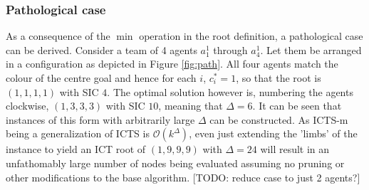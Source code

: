 \documentclass[english,10pt]{article}
\begin{document}
	\subsubsection{Pathological case}
	\label{pathology}
	As a consequence of the $\min$ operation in the root definition, a pathological case can be derived. Consider a team of 4 agents $a_1^1$ through $a_4^1$. Let them be arranged in a configuration as depicted in Figure \ref{fig:path}. All four agents match the colour of the centre goal and hence for each $i$, $c^*_i = 1$, so that the root is $(1,1,1,1)$ with SIC $4$. The optimal solution however is, numbering the agents clockwise, $(1,3,3,3)$ with SIC $10$, meaning that $\Delta = 6$. It can be seen that instances of this form with arbitrarily large $\Delta$ can be constructed. As ICTS-m being a generalization of ICTS is $\mathcal{O}(k^\Delta)$, even just extending the 'limbs' of the instance to yield an ICT root of $(1,9,9,9)$ with $\Delta = 24$ will result in an unfathomably large number of nodes being evaluated assuming no pruning or other modifications to the base algorithm. [TODO: reduce case to just 2 agents?]
	
\end{document}
